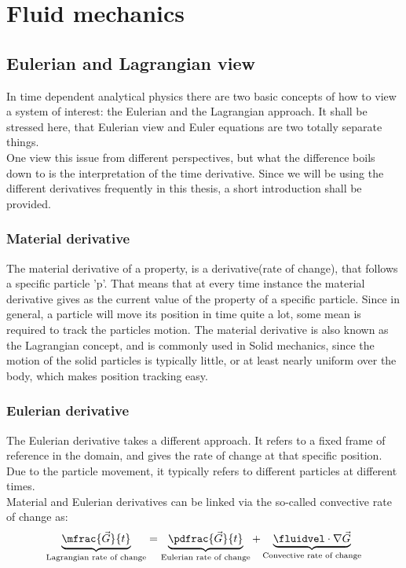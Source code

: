 \documentclass[../main.tex]{subfiles}
\begin{document}
\setlength{\delimitershortfall}{0pt}

\section{Fluid mechanics}\label{sec:fluid_mechanics}
\subsection{Eulerian and Lagrangian view}\label{sec:eulerian_lagrangian}
In time dependent analytical physics there are two basic concepts of how to view a system of interest: the Eulerian and the Lagrangian approach. It shall be stressed here, that Eulerian view and Euler equations are two totally separate things.\\
One view this issue from different perspectives, but what the difference boils down to is the interpretation of the time derivative. Since we will be using the different derivatives frequently in this thesis, a short introduction shall be provided.
\subsubsection{Material derivative}
The material derivative of a property, is a derivative(rate of change), that follows a specific particle 'p'. That means that at every time instance the material derivative gives as the current value of the property of a specific particle. Since in general, a particle will move its position in time quite a lot, some mean is required to track the particles motion. The material derivative is also known as the Lagrangian concept, and is commonly used in Solid mechanics, since the motion of the solid particles is typically little, or at least nearly uniform over the body, which makes position tracking easy.

\subsubsection{Eulerian derivative}
The Eulerian derivative takes a different approach. It refers to a fixed frame of reference in the domain, and gives the rate of change at that specific position. Due to the particle movement, it typically refers to different particles at different times.
\\
Material and Eulerian derivatives can be linked via the so-called convective rate of change as:
\begin{align}
\underbrace{\mfrac{\vec{G}}{t}}_{\text{Lagrangian rate of change}} = \underbrace{\pdfrac{\vec{G}}{t}}_{\text{Eulerian rate of change}} + \underbrace{\fluidvel\cdot\nabla\vec{G}}_{\text{Convective rate of change}}
\end{align}
\end{document}
